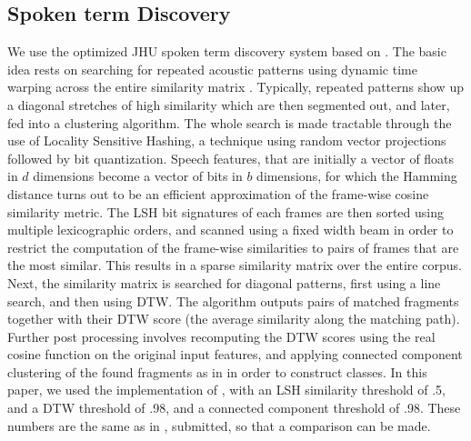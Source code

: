 \documentclass[a4paper]{article}
\begin{document}
\subsection{Spoken term Discovery}
We use the optimized JHU spoken term discovery system based on \cite{jansen}. The basic idea rests on searching for repeated acoustic patterns using dynamic time warping across the entire similarity matrix \cite{park}. Typically, repeated patterns show up a diagonal stretches of high similarity which are then segmented out, and later, fed into a clustering algorithm. The whole search is made tractable through the use of Locality Sensitive Hashing, a technique using random vector projections followed by bit quantization. Speech features, that are initially a vector of floats in $d$ dimensions become a vector of bits in $b$ dimensions, for which the Hamming distance turns out to be an efficient approximation of the frame-wise cosine similarity metric. The LSH bit signatures of each frames are then sorted using multiple lexicographic orders, and scanned using a fixed width beam in order to restrict the computation of the frame-wise similarities to pairs of frames that are the most similar. This results in a sparse similarity matrix over the entire corpus. Next, the similarity matrix is searched for diagonal patterns, first using a line search, and then using DTW.  The algorithm outputs pairs of matched fragments together with their DTW score (the average similarity along the matching path). Further post processing involves recomputing the DTW scores using the real cosine function on the original input features, and applying connected component clustering of the found fragments as in \cite{park} in order to construct classes. In this paper, we used the implementation of \cite{jansen}, with an LSH similarity threshold of .5, and a DTW  threshold of .98, and a connected component threshold of .98. These numbers are the same as in \cite{}, submitted, so that a comparison can be made. 
\end{document}
